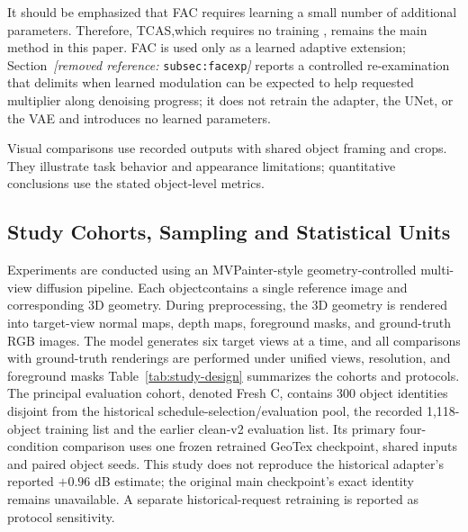 \documentclass[times,twocolumn,final]{elsarticle}
\providecommand{\DIFadd}[1]{{\protect\color{blue} \sf #1}} %
\providecommand{\DIFdel}[1]{{\protect\color{red} \scriptsize #1}} %
\providecommand{\DIFaddbegin}{} %
\providecommand{\DIFaddend}{} %
\providecommand{\DIFdelbegin}{} %
\providecommand{\DIFdelend}{} %
\begin{document}
\DIFdel{It should be emphasized that FAC requires learning a small number of additional parameters. Therefore, TCAS,which requires no training , remains the main method in this paper. FAC is used only as a learned adaptive extension; Section~\textit{[removed reference: }\texttt{subsec:facexp}\textit{]} reports a controlled re-examination that delimits when learned modulation can be expected to help}\DIFdelend \DIFaddbegin \DIFadd{requested multiplier along denoising progress; it does not retrain the adapter, the UNet, or the VAE and introduces no learned parameters}\DIFaddend .

\DIFdelbegin %
\DIFdelend \DIFaddbegin \DIFadd{Visual comparisons use recorded outputs with shared object framing and crops. They illustrate task behavior and appearance limitations; quantitative conclusions use the stated object-level metrics.
}\DIFaddend

\DIFdelbegin %
\DIFdelend \DIFaddbegin \subsection{Study Cohorts, Sampling and Statistical Units}
\DIFaddend \label{subsec:setup}

\DIFdelbegin %

\DIFdel{Experiments are conducted using an MVPainter-style geometry-controlled multi-view diffusion pipeline. Each objectcontains a single reference image and corresponding 3D geometry. During preprocessing, the 3D geometry is rendered into target-view normal maps, depth maps, foreground masks, and ground-truth RGB images. The model generates six target views at a time, and all comparisons with ground-truth renderings are performed under unified views, resolution, and foreground masks}\DIFdelend \DIFaddbegin \DIFadd{Table~\ref{tab:study-design} summarizes the cohorts and protocols. The principal evaluation cohort, denoted Fresh C, contains 300 object identities disjoint from the historical schedule-selection/evaluation pool, the recorded 1,118-object training list and the earlier clean-v2 evaluation list. Its primary four-condition comparison uses one frozen retrained GeoTex checkpoint, shared inputs and paired object seeds. This study does not reproduce the historical adapter's reported $+0.96$ dB estimate; the original main checkpoint's exact identity remains unavailable. A separate historical-request retraining is reported as protocol sensitivity}\DIFaddend .
\end{document}
